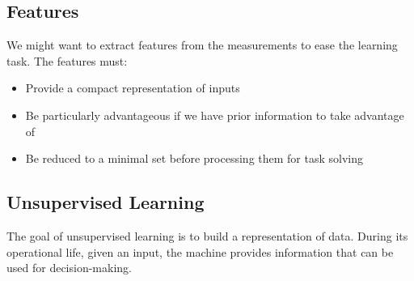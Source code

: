 \documentclass{article}
\begin{document}
\subsection{Features}
We might want to extract features from the measurements to ease the learning task. The features must:
\begin{itemize}
	\item Provide a compact representation of inputs
	\item Be particularly advantageous if we have prior information to take advantage of
	\item Be reduced to a minimal set before processing them for task solving
\end{itemize}

\subsection{Unsupervised Learning}
The goal of unsupervised learning is to build a representation of data. During its operational life, given an input, the machine provides information that can be used for decision-making.
\end{document}
